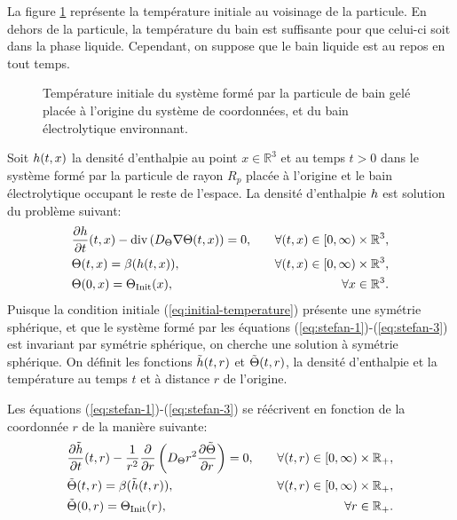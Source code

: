 La figure \ref{fig:particle-initial-temperature} représente la
température initiale au voisinage de la particule. En dehors de la
particule, la température du bain est suffisante pour que celui-ci
soit dans la phase liquide. Cependant, on suppose que le bain liquide
est au repos en tout temps.

\begin{figure}[h]
  \begin{center}
    
    \caption{Température initiale du système formé par la
      particule de bain gelé placée à l'origine du système de
      coordonnées, et du bain électrolytique environnant.}
    \label{fig:particle-initial-temperature}
  \end{center}
\end{figure}

Soit $h(t, x)$ la densité d'enthalpie au point $x\in\mathbb
R^3$ et au temps $t > 0$ dans le système formé par la particule de
rayon $R_p$ placée à l'origine et le bain électrolytique
occupant le reste de l'espace. La densité d'enthalpie
$h$ est solution du problème suivant:
\begin{align}
  &\frac{\partial \enthalpydensity}{\partial t}(t,x) -\div %
  \parent{\electrolytetdiff\nabla \temperature(t, x)} = 0,& \quad %
  \forall (t, x) \in [0,\infty)\times \mathbb R^3,\label{eq:stefan-1}\\
  &\temperature(t, x) = \beta(\enthalpydensity(t, x)), & \quad %
  \forall (t, x) \in [0,\infty)\times \mathbb R^3,\label{eq:stefan-2}\\
    &\temperature(0, x) = \tinit(x),& \quad \forall x\in \mathbb R^3.\label{eq:stefan-3}
\end{align}
Puisque la condition initiale (\ref{eq:initial-temperature}) présente
une symétrie sphérique, et que le système formé par les équations
(\ref{eq:stefan-1})-(\ref{eq:stefan-3}) est invariant par symétrie
sphérique, on cherche une solution à symétrie sphérique. On définit
les fonctions $\tilde{h}(t, r)$ et $\tilde{\Theta}(t, r)$, la
densité d'enthalpie et la température au temps $t$ et à distance $r$
de l'origine.

Les équations (\ref{eq:stefan-1})-(\ref{eq:stefan-3}) se réécrivent en
fonction de la coordonnée $r$ de la manière suivante:
\begin{align}
  &\frac{\partial\tilde{h}}{\partial t}(t, r) -
  \frac{1}{r^2}\frac{\partial}{\partial
    r}\left( D_\Theta r^2\frac{\partial \tilde{\Theta}}{\partial r} \right) = 0, &\quad
  \forall (t, r)\in [0, \infty)\times \mathbb R_+,\label{eq:stefan-r-1}\\
    &\tilde{\Theta}(t, r) = \beta(\tilde{h}(t, r)), &\quad
    \forall (t, r)\in [0, \infty)\times \mathbb R_+,\label{eq:stefan-r-2}\\
      &\tilde{\Theta}(0, r) = \Theta_\text{Init}(r),&\quad \forall r \in \mathbb R_+.\label{eq:stefan-r-3}
\end{align}

